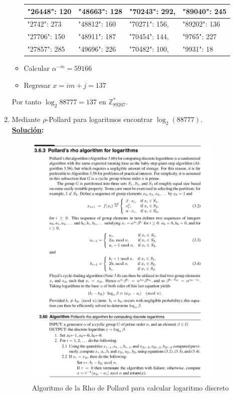 \documentclass[11pt,letterpaper]{article}
\newcommand{\Z}{\mathbb{Z}}
\newcommand{\sol}{\textbf{\underline{Solución}: }} %
\begin{document}
\begin{enumerate}[label=\alph*)]
\begin{itemize}
\begin{table}[H]
\begin{longtable}{|l|l|l|l|}
"26448": 120 & "48663": 128 & "70243": 292, & "89040": 245 \\ \hline
"2742":  273 & "48812": 160 & "70271": 156, & "89202": 136 \\ \hline
"27706": 150 & "48911": 187 & "70454": 144, & "9765": 227 \\ \hline
"27857": 285 & "49696": 226 & "70482": 100, & "9931": 18 \\ \hline 
\end{longtable}
\end{table}
\item Calcular $\alpha^{-m} = 59166$
\item Regresar $x = im + j = 137$
\end{itemize}
Por tanto $\log_2 88777= 137$ en $\Z_{89267}^*$.

\item Mediante $\rho$-Pollard para logaritmos encontrar $\log_2 (88777)$.\\
\sol 
\begin{figure}[H]
\caption{Algoritmo de la Rho de Pollard para calcular logaritmo discreto}
\centering
\includegraphics[width=0.9\textwidth]{assets/1d.png}
\end{figure}


\end{enumerate}
\end{document}
